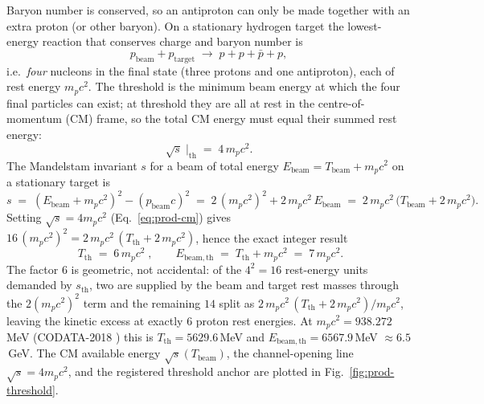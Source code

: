 Baryon number is conserved, so an antiproton can only be made together with
an extra proton (or other baryon). On a stationary hydrogen target the
lowest-energy reaction that conserves charge and baryon number is
\begin{equation}
p_{\mathrm{beam}} + p_{\mathrm{target}}
\;\longrightarrow\;
p + p + \bar p + p ,
\label{eq:prod-channel}
\end{equation}
i.e.\ \emph{four} nucleons in the final state (three protons and one
antiproton), each of rest energy $m_pc^2$. The threshold is the minimum
beam energy at which the four final particles can exist; at threshold they
are all at rest in the centre-of-momentum (CM) frame, so the total CM
energy must equal their summed rest energy:
\begin{equation}
\sqrt{s}\;\Big|_{\mathrm{th}}
\;=\; 4\,m_p c^2 .
\label{eq:prod-cm}
\end{equation}
The Mandelstam invariant $s$ for a beam of total energy
$E_{\mathrm{beam}}=T_{\mathrm{beam}}+m_pc^2$ on a stationary target is
\begin{equation}
s \;=\; (E_{\mathrm{beam}}+m_pc^2)^2 - (p_{\mathrm{beam}}c)^2
  \;=\; 2\,(m_pc^2)^2 + 2\,m_pc^2\,E_{\mathrm{beam}}
  \;=\; 2\,m_pc^2\,\bigl(T_{\mathrm{beam}}+2\,m_pc^2\bigr).
\label{eq:prod-s}
\end{equation}
Setting $\sqrt{s}=4m_pc^2$ (Eq.~\eqref{eq:prod-cm}) gives
$16\,(m_pc^2)^2 = 2\,m_pc^2\,(T_{\mathrm{th}}+2\,m_pc^2)$, hence the exact
integer result
\begin{equation}
\boxed{\;T_{\mathrm{th}} \;=\; 6\,m_p c^2\;},
\qquad
E_{\mathrm{beam,th}} \;=\; T_{\mathrm{th}} + m_p c^2 \;=\; 7\,m_p c^2 .
\label{eq:prod-result}
\end{equation}
The factor $6$ is geometric, not accidental: of the $4^2=16$ rest-energy
units demanded by $s_{\mathrm{th}}$, two are supplied by the beam and target
rest masses through the $2(m_pc^2)^2$ term and the remaining $14$ split as
$2\,m_pc^2\,(T_{\mathrm{th}}+2\,m_pc^2)/m_pc^2$, leaving the kinetic excess
at exactly $6$ proton rest energies. At $m_pc^2=938.272$\,MeV (CODATA-2018
\citep{mohr2018codata}) this is $T_{\mathrm{th}}=5629.6$\,MeV and
$E_{\mathrm{beam,th}}=6567.9$\,MeV $\approx6.5$\,GeV. The CM available energy
$\sqrt{s}(T_{\mathrm{beam}})$, the channel-opening line $\sqrt{s}=4m_pc^2$,
and the registered threshold anchor are plotted in
Fig.~\ref{fig:prod-threshold}.

